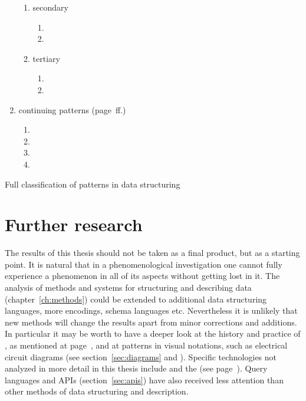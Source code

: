 \begin{table}
\begin{enumerate}
\begin{enumerate}
      \item secondary
      \begin{enumerate}
        \item {}
		\item {}
      \end{enumerate}
      \item tertiary
      \begin{enumerate}
	    \item {}
		\item {}
      \end{enumerate}
    \end{enumerate}
  \item continuing patterns (page~\pageref{sec:continuing-patterns}ff.)
	  \begin{enumerate}[label=\roman*.]
      \item {}
      \item {}
      \item {}
      \item {}
    \end{enumerate}
\end{enumerate}
\caption{Full classification of patterns in data structuring}
\label{tab:patternclassification}
\end{table}



\section{Further research}
\label{sec:further}

The results of this thesis should not be taken as a final product, but as a
starting point. It is natural that in a phenomenological investigation one
cannot fully experience a phenomenon in all of its aspects without getting lost
in it. The analysis of methods and systems for structuring and describing data
(chapter~\ref{ch:methods}) could be extended to additional data structuring
languages, more encodings, schema languages etc. Nevertheless it is unlikely
that new methods will change the results apart from minor corrections and
additions. In particular it may be worth to have a deeper look at the history
and practice of , as mentioned at page~\pageref{sec:forms},
and at patterns in visual notations, such as electrical circuit diagrams (see
section~\ref{sec:diagrams} and \textcite{Tversky2011}). Specific technologies
not analyzed in more detail in this thesis include 
\cite{Nelson2004,McGuffin2004,Dattolo2009a,Pourabdollah2009b,Gutteridge2010}
and the  (see page~\pageref{sec:dfdl}).
Query languages and APIs (section~\ref{sec:apis}) have also received less
attention than other methods of data structuring and description.

